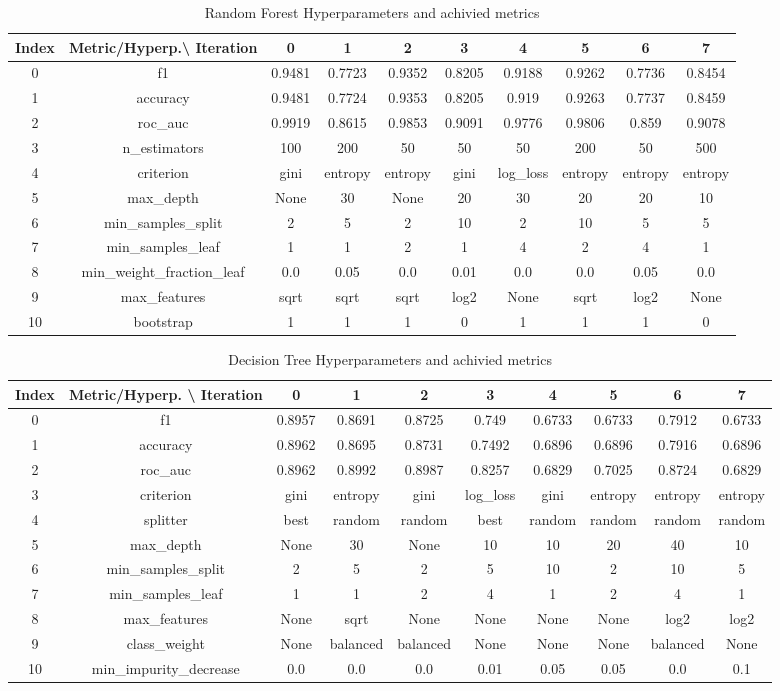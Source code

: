 \documentclass{article}%
\begin{document}
\begin{table}[h!]%
\caption{Random Forest Hyperparameters and achivied metrics}%
\vspace{0.2cm}%
\centering%
\begin{tabular}{|c||c||c||c||c||c||c||c||c||c|}%
\hline%
Index&Metric/Hyperp.\textbackslash{} Iteration&0&1&2&3&4&5&6&7\\%
\hline%
0&f1&0.9481&0.7723&0.9352&0.8205&0.9188&0.9262&0.7736&0.8454\\%
1&accuracy&0.9481&0.7724&0.9353&0.8205&0.919&0.9263&0.7737&0.8459\\%
2&roc\_auc&0.9919&0.8615&0.9853&0.9091&0.9776&0.9806&0.859&0.9078\\%
3&n\_estimators&100&200&50&50&50&200&50&500\\%
4&criterion&gini&entropy&entropy&gini&log\_loss&entropy&entropy&entropy\\%
5&max\_depth&None&30&None&20&30&20&20&10\\%
6&min\_samples\_split&2&5&2&10&2&10&5&5\\%
7&min\_samples\_leaf&1&1&2&1&4&2&4&1\\%
8&min\_weight\_fraction\_leaf&0.0&0.05&0.0&0.01&0.0&0.0&0.05&0.0\\%
9&max\_features&sqrt&sqrt&sqrt&log2&None&sqrt&log2&None\\%
10&bootstrap&1&1&1&0&1&1&1&0\\%
\hline%
\end{tabular}%
\end{table}

%


\begin{table}[h!]%
\caption{Decision Tree Hyperparameters and achivied metrics}%
\vspace{0.2cm}%
\centering%
\begin{tabular}{|c||c||c||c||c||c||c||c||c||c|}%
\hline%
Index&Metric/Hyperp. \textbackslash{} Iteration&0&1&2&3&4&5&6&7\\%
\hline%
0&f1&0.8957&0.8691&0.8725&0.749&0.6733&0.6733&0.7912&0.6733\\%
1&accuracy&0.8962&0.8695&0.8731&0.7492&0.6896&0.6896&0.7916&0.6896\\%
2&roc\_auc&0.8962&0.8992&0.8987&0.8257&0.6829&0.7025&0.8724&0.6829\\%
3&criterion&gini&entropy&gini&log\_loss&gini&entropy&entropy&entropy\\%
4&splitter&best&random&random&best&random&random&random&random\\%
5&max\_depth&None&30&None&10&10&20&40&10\\%
6&min\_samples\_split&2&5&2&5&10&2&10&5\\%
7&min\_samples\_leaf&1&1&2&4&1&2&4&1\\%
8&max\_features&None&sqrt&None&None&None&None&log2&log2\\%
9&class\_weight&None&balanced&balanced&None&None&None&balanced&None\\%
10&min\_impurity\_decrease&0.0&0.0&0.0&0.01&0.05&0.05&0.0&0.1\\%
\hline%
\end{tabular}%
\end{table}
\end{document}
